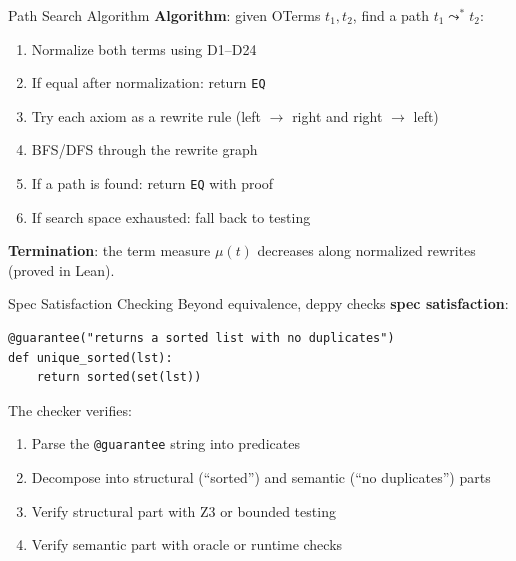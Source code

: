 \documentclass[aspectratio=169,11pt]{beamer}
\begin{document}
\begin{frame}{Path Search Algorithm}
\textbf{Algorithm}: given OTerms $t_1, t_2$, find a path $t_1 \leadsto^* t_2$:

\begin{enumerate}
\item Normalize both terms using D1--D24
\item If equal after normalization: return \texttt{EQ}
\item Try each axiom as a rewrite rule (left $\to$ right and right $\to$ left)
\item BFS/DFS through the rewrite graph
\item If a path is found: return \texttt{EQ} with proof
\item If search space exhausted: fall back to testing
\end{enumerate}

\vspace{0.5em}
\textbf{Termination}: the term measure $\mu(t)$ decreases along normalized rewrites (proved in Lean).
\end{frame}

\begin{frame}{Spec Satisfaction Checking}
Beyond equivalence, deppy checks \textbf{spec satisfaction}:

\begin{lstlisting}[language=deppy]
@guarantee("returns a sorted list with no duplicates")
def unique_sorted(lst):
    return sorted(set(lst))
\end{lstlisting}

\vspace{0.3em}
The checker verifies:
\begin{enumerate}
\item Parse the \texttt{@guarantee} string into predicates
\item Decompose into structural (``sorted'') and semantic (``no duplicates'') parts
\item Verify structural part with Z3 or bounded testing
\item Verify semantic part with oracle or runtime checks
\end{enumerate}
\end{frame}
\end{document}
